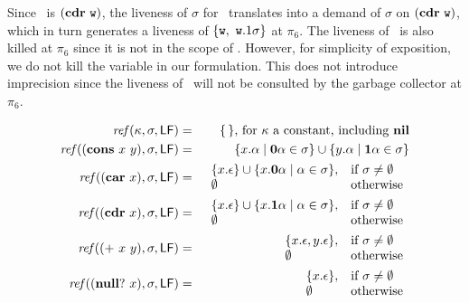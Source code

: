 \documentclass{sig-alternate}
\begin{document}
Since   \pu\  is  $(\mbox{$\mathbf{cdr}$}~   \mbox{\tt w})$,  the   liveness  of   $\sigma$  for
\pu\ translates  into a demand  of $\sigma$ on $(\mbox{$\mathbf{cdr}$}~\mbox{\tt w})$,  which in
turn generates  a liveness  of $\{\mbox{\tt w},~\mbox{\tt w}.1\sigma\}$ at  $\pi_6$. The
liveness of  \pu\ is  also killed at  $\pi_6$ since  it is not  in the
scope of  \pu. However, for simplicity  of exposition, we  do not kill
the variable in our  formulation.  This does not introduce imprecision
since  the liveness  of  \pu\ will  not  be consulted  by the  garbage
collector at $\pi_6$.
\begin{figure*}[t]  
\begin{eqnarray*}
\mathit{ref\/}(\kappa,\sigma,\Lfonly)
          &=& \{\,\} \mbox{, for $\kappa$ a constant, including $\NIL$}\\
\mathit{ref\/}((\CONS~x~y),\sigma,\Lfonly)
          &=& \{x.\alpha \mid \acar\alpha \in \sigma\} \cup \{y.\alpha \mid \acdr\alpha \in \sigma\} \\
\mathit{ref\/}((\CAR~x),\sigma,\Lfonly)
          &=&    \begin{array}{l l}
                    \{x.\epsilon\} \cup \{x.\acar\alpha \mid \alpha \in
\sigma\}, & \mbox{if}~\sigma \ne \emptyset\\
                    \emptyset  & \mbox{otherwise}
                 \end{array} \\
\mathit{ref\/}((\CDR~x),\sigma,\Lfonly)
          &=&    \begin{array}{l l}
                    \{x.\epsilon\} \cup \{x.\acdr\alpha \mid \alpha \in
\sigma\}, & \mbox{if}~\sigma \ne \emptyset\\
                    \emptyset  & \mbox{otherwise}
                 \end{array} \\
\mathit{ref\/}((\PRIM~x~y),\sigma,\Lfonly)
          &=&    \begin{array}{l l}
                    \{x.\epsilon, y.\epsilon\},  & \mbox{if}~\sigma \ne \emptyset\\
                    \emptyset  & \mbox{otherwise}
                 \end{array} \\
\mathit{ref\/}((\NULLQ~x),\sigma,\Lfonly)
          &=&    \begin{array}{l l}
                    \{x.\epsilon\},  & \mbox{if}~\sigma \ne \emptyset\\
                    \emptyset  & \mbox{otherwise}
                 \end{array} \\

\end{eqnarray*}
\end{figure*}
\end{document}
